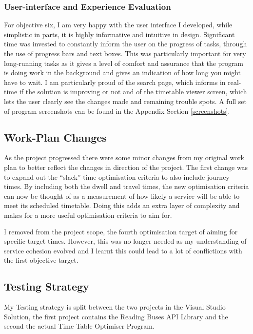 \documentclass{article}
\begin{document}
\subsubsection{User-interface and Experience Evaluation }
For objective six, I am very happy with the user interface I developed, while simplistic in parts, it is highly informative and intuitive in design. Significant time was invested to constantly inform the user on the progress of tasks, through the use of progress bars and text boxes. This was particularly important for very long-running tasks as it gives a level of comfort and assurance that the program is doing work in the background and gives an indication of how long you might have to wait. I am particularly proud of the search page, which informs in real-time if the solution is improving or not and of the timetable viewer screen, which lets the user clearly see the changes made and remaining trouble spots. A full set of program screenshots can be found in the Appendix Section \ref{screenshots}.




\subsection{Work-Plan Changes}
As the project progressed there were some minor changes from my original work plan to better reflect the changes in direction of the project. The first change was to expand out the ``slack'' time optimisation criteria to also include journey times. By including both the dwell and travel times, the new optimisation criteria can now be thought of as a measurement of how likely a service will be able to meet its scheduled timetable. Doing this adds an extra layer of complexity and makes for a more useful optimisation criteria to aim for.

\par 
I removed from the project scope, the fourth optimisation target of aiming for specific target times. However, this was no longer needed as my understanding of service cohesion evolved and I learnt this could lead to a lot of conflictions with the first objective target.


\subsection{Testing Strategy}
\label{testing}
My Testing strategy is split between the two projects in the Visual Studio Solution, the first project contains the Reading Buses API Library and the second the actual Time Table Optimiser Program.   
\end{document}

